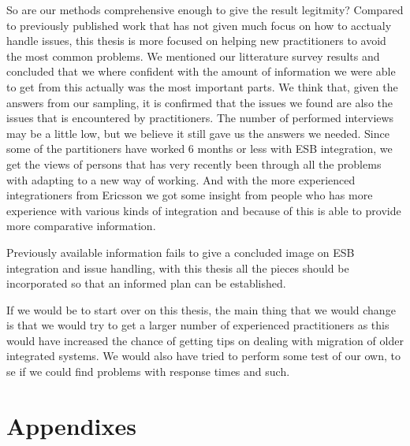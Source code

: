 \documentclass{llncs}
\begin{document}
So are our methods comprehensive enough to give the result legitmity? Compared to previously published work that has not given much focus on how to acctualy handle issues, this thesis is more focused on helping new practitioners to avoid the most common problems.
We mentioned our litterature survey results and concluded that we where confident with the amount of information we were able to get from this actually was the most important parts. We think that, given the answers from our sampling, it is confirmed that the issues we found are also the issues that is encountered by practitioners.
The number of performed interviews may be a little low, but we believe it still gave us the answers we needed. Since some of the partitioners have worked 6 months or less with ESB integration, we get the views of persons that has very recently been through all the problems with adapting to a new way of working. And with the more experienced integrationers from Ericsson we got some insight from people who has more experience with various kinds of integration and because of this is able to provide more comparative information.

Previously available information fails to give a concluded image on ESB integration and issue handling, with this thesis all the pieces should be incorporated so that an informed plan can be established.

If we would be to start over on this thesis, the main thing that we would change is that we would try to get a larger number of experienced practitioners as this would have increased the chance of getting tips on dealing with migration of older integrated systems. We would also have tried to perform some test of our own, to se if we could find problems with response times and such.

\newpage



\newpage
\section*{Appendixes}
\appendix


\end{document}
